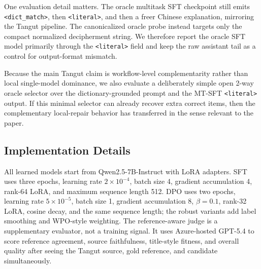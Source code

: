 One evaluation detail matters. The oracle multitask SFT checkpoint still emits \texttt{<dict\_match>}, then \texttt{<literal>}, and then a freer Chinese explanation, mirroring the Tangut pipeline. The canonicalized oracle probe instead targets only the compact normalized decipherment string. We therefore report the oracle SFT model primarily through the \texttt{<literal>} field and keep the raw assistant tail as a control for output-format mismatch.

Because the main Tangut claim is workflow-level complementarity rather than local single-model dominance, we also evaluate a deliberately simple open 2-way oracle selector over the dictionary-grounded prompt and the MT-SFT \texttt{<literal>} output. If this minimal selector can already recover extra correct items, then the complementary local-repair behavior has transferred in the sense relevant to the paper.

\subsection{Implementation Details}

All learned models start from Qwen2.5-7B-Instruct with LoRA adapters. SFT uses three epochs, learning rate $2\times10^{-4}$, batch size 4, gradient accumulation 4, rank-64 LoRA, and maximum sequence length 512. DPO uses two epochs, learning rate $5\times10^{-5}$, batch size 1, gradient accumulation 8, $\beta=0.1$, rank-32 LoRA, cosine decay, and the same sequence length; the robust variants add label smoothing and WPO-style weighting. The reference-aware judge is a supplementary evaluator, not a training signal. It uses Azure-hosted GPT-5.4 to score reference agreement, source faithfulness, title-style fitness, and overall quality after seeing the Tangut source, gold reference, and candidate simultaneously.
